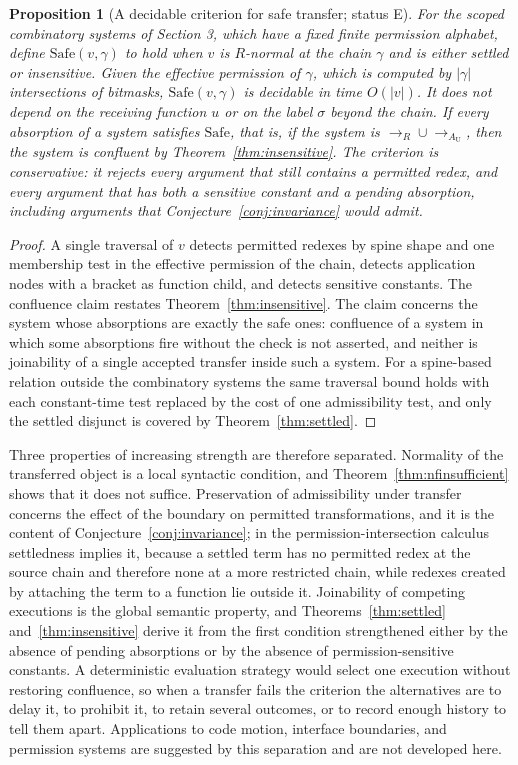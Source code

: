 \documentclass[11pt]{article}
\newtheorem{proposition}[theorem]{Proposition}
\theoremstyle{definition}
\theoremstyle{remark}
\newcommand{\Et}{status E}
\begin{document}
\begin{proposition}[A decidable criterion for safe transfer; \Et]\label{prop:safe}
For the scoped combinatory systems of Section 3, which have a fixed finite permission alphabet, define $\mathrm{Safe}(v,\gamma)$ to hold when $v$ is $R$-normal at the chain $\gamma$ and is either settled or insensitive. Given the effective permission of $\gamma$, which is computed by $|\gamma|$ intersections of bitmasks, $\mathrm{Safe}(v,\gamma)$ is decidable in time $O(|v|)$. It does not depend on the receiving function $u$ or on the label $\sigma$ beyond the chain. If every absorption of a system satisfies $\mathrm{Safe}$, that is, if the system is $\to_R\cup\to_{A_{\mathrm U}}$, then the system is confluent by Theorem~\ref{thm:insensitive}. The criterion is conservative: it rejects every argument that still contains a permitted redex, and every argument that has both a sensitive constant and a pending absorption, including arguments that Conjecture~\ref{conj:invariance} would admit.
\end{proposition}

\begin{proof}
A single traversal of $v$ detects permitted redexes by spine shape and one membership test in the effective permission of the chain, detects application nodes with a bracket as function child, and detects sensitive constants. The confluence claim restates Theorem~\ref{thm:insensitive}. The claim concerns the system whose absorptions are exactly the safe ones: confluence of a system in which some absorptions fire without the check is not asserted, and neither is joinability of a single accepted transfer inside such a system. For a spine-based relation outside the combinatory systems the same traversal bound holds with each constant-time test replaced by the cost of one admissibility test, and only the settled disjunct is covered by Theorem~\ref{thm:settled}.
\end{proof}

Three properties of increasing strength are therefore separated. Normality of the transferred object is a local syntactic condition, and Theorem~\ref{thm:nfinsufficient} shows that it does not suffice. Preservation of admissibility under transfer concerns the effect of the boundary on permitted transformations, and it is the content of Conjecture~\ref{conj:invariance}; in the permission-intersection calculus settledness implies it, because a settled term has no permitted redex at the source chain and therefore none at a more restricted chain, while redexes created by attaching the term to a function lie outside it. Joinability of competing executions is the global semantic property, and Theorems~\ref{thm:settled} and~\ref{thm:insensitive} derive it from the first condition strengthened either by the absence of pending absorptions or by the absence of permission-sensitive constants. A deterministic evaluation strategy would select one execution without restoring confluence, so when a transfer fails the criterion the alternatives are to delay it, to prohibit it, to retain several outcomes, or to record enough history to tell them apart. Applications to code motion, interface boundaries, and permission systems are suggested by this separation and are not developed here.
\end{document}
